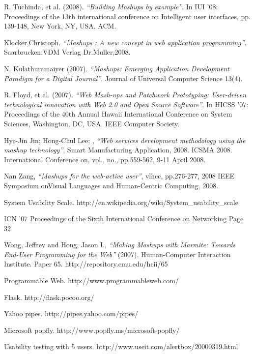 \begin{thebibliography}{27}
 R. Tuchinda, et al. (2008). \emph{``Building Mashups by example''}. In IUI '08: Proceedings of the
  13th international conference on Intelligent user interfaces, pp. 139-148, New York, NY, USA.
  ACM.

 Klocker,Christoph. \emph{``Mashups : A new concept in web application programming''}. Saarbrucken:VDM Verlag Dr.Muller,2008.

 N. Kulathuramaiyer (2007). \emph{``Mashups: Emerging Application Development Paradigm for a Digital Journal''}. Journal of Universal Computer Science 13(4).

 R. Floyd, et al. (2007). \emph{``Web Mash-ups and Patchwork Prototyping: User-driven technological innovation with Web 2.0 and Open Source Software''}. In HICSS '07: Proceedings  of the 40th Annual Hawaii International Conference on System Sciences, Washington, DC, USA. IEEE Computer Society.

 Hye-Jin Jin; Hong-Chul Lee; , \emph{``Web services development methodology using the mashup  technology''}, Smart Manufacturing Application, 2008. ICSMA 2008. International Conference on, vol., no., pp.559-562, 9-11 April 2008.

 Nan Zang, \emph{``Mashups for the web-active user''}, vlhcc, pp.276-277, 2008 IEEE Symposium onVisual Languages and Human-Centric Computing, 2008.

 System Usability Scale. http://en.wikipedia.org/wiki/System_usability_scale

 ICN '07 Proceedings of the Sixth International Conference on Networking
  Page 32

 Wong, Jeffrey and Hong, Jason I., \emph{``Making Mashups with Marmite: Towards End-User Programming for the Web''} (2007). Human-Computer Interaction Institute. Paper 65.
  http://repository.cmu.edu/hcii/65

 Programmable Web. http://www.programmableweb.com/

 Flask. http://flask.pocoo.org/

 Yahoo pipes. http://pipes.yahoo.com/pipes/

 Microsoft popfly. http://www.popfly.ms/microsoft-popfly/

 Usability testing with 5 users. http://www.useit.com/alertbox/20000319.html

\end{thebibliography}


